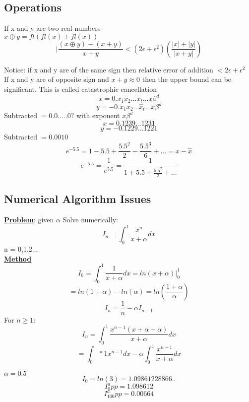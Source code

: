 \documentclass[12pt]{article}
\newcommand{\myt}[1]{\textbf{\underline{#1}}}
\begin{document}
	\subsection*{Operations}
	If x and y are two real numbers\\
	$x \oplus y = fl(fl(x) + fl(x))$\\
	
	$$|\frac{(x \oplus y) - (x + y)}{x+y} < (2\epsilon + \epsilon^2)(\frac{|x| + |y|}{|x+y|})$$
	
	Notice: if x and y are of the same sign then relative error of addition $< 2\epsilon + \epsilon^2$\\
	
	If x and y are of opposite sign and $x + y \approx 0$ then the upper bound can be significant. This is called catastrophic cancellation\\
	
	$$x = 0.x_1x_2...x_t...x\beta^d$$
	$$y = -0.x_1x_2...\hat{x}_t...x\beta^d$$
	Subtracted $ = 0.0.....0?$ with exponent $x\beta^d$\\
	
	$$x =  0.1239...1231$$
	$$y = -0.1229...1221$$
	Subtracted $= 0.0010$\\
	
	$$e^{-5.5} = 1 - 5.5 + \frac{5.5^2}{2} - \frac{5.5^3}{6} + ... = x - \hat{x}$$
	$$e^{-5.5} = \frac{1}{e^{5.5}} = \frac{1}{1 + 5.5 + \frac{5.5^2}{2} + ...}$$	
	
	\subsection*{Numerical Algorithm Issues}
	
	\myt{Problem}: given $\alpha$ Solve numerically:\\
	
	$$I_n = \int_{0}^{1}\frac{x^n}{x+\alpha}dx$$
	n = 0,1,2...\\

	\myt{Method}\\
	$$I_0 = \int_{0}^{1}\frac{1}{x+\alpha}dx = ln(x+\alpha)|_0^1$$
	$$ = ln(1+\alpha) - ln(\alpha) = ln(\frac{1+\alpha}{\alpha})$$
	$$I_n = \frac{1}{n} - \alpha I_{n-1}$$
	For $n \ge 1$:\\
	$$I_n = \int_{0}^{1}\frac{x^{n-1}(x + \alpha - \alpha)}{x+\alpha}dx$$
	$$= \int_{0}*{1}x^{n-1}dx - \alpha\int_{0}^{1}\frac{x^{n-1}}{x+\alpha}dx$$
	
	$\alpha = 0.5$\\
	$$I_0 = ln(3) = 1.09861228866..$$
	$$I_0^app = 1.098612$$
	$$I_100^app = 0.00664$$
	
\end{document}
